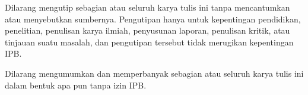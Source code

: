 Dilarang mengutip sebagian atau seluruh karya tulis ini tanpa mencantumkan
atau menyebutkan sumbernya. Pengutipan hanya untuk kepentingan pendidikan,
penelitian, penulisan karya ilmiah, penyusunan laporan, penulisan kritik, atau
tinjauan suatu masalah, dan pengutipan tersebut tidak merugikan kepentingan
IPB.

\vspace{10pt}

Dilarang mengumumkan dan memperbanyak sebagian atau seluruh karya tulis ini
dalam bentuk apa pun tanpa izin IPB.

\vspace*{24pt}
